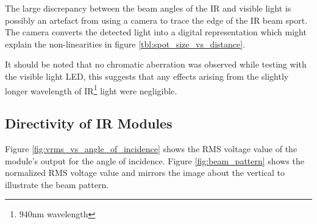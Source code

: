 The large discrepancy between the beam angles of the IR and visible light is possibly an artefact from using a camera to trace the edge of the IR beam sport. The camera converts the detected light into a digital representation which might explain the non-linearities in figure \ref{tbl:spot_size_vs_distance}.

It should be noted that no chromatic aberration was observed while testing with the visible light LED, this suggests that any effects arising from the slightly longer wavelength of IR\footnote{940nm wavelength} light were negligible.






\subsection{Directivity of IR Modules}

Figure \ref{fig:vrms_vs_angle_of_incidence} shows the RMS voltage value of the module's output for the angle of incidence. Figure \ref{fig:beam_pattern} shows the normalized RMS voltage value and mirrors the image about the vertical to illustrate the beam pattern.


